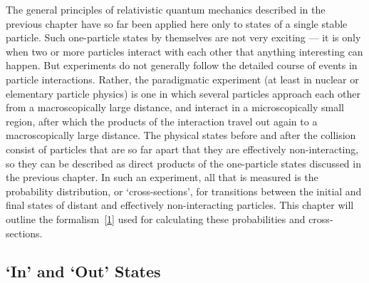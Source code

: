 
The general principles of relativistic quantum mechanics described in the
previous chapter have so far been applied here only to states of a single
stable particle. Such one-particle states by themselves are not very exciting
--- it is only when two or more particles interact with each other that
anything interesting can happen. But experiments do not generally follow the
detailed course of events in particle interactions. Rather, the paradigmatic
experiment (at least in nuclear or elementary particle physics) is one in
which several particles approach each other from a macroscopically large
distance, and interact in a microscopically small region, after which the
products of the interaction travel out again to a macroscopically large
distance. The physical states before and after the collision consist of
particles that are so far apart that they are effectively non-interacting, so
they can be described as direct products of the one-particle states discussed
in the previous chapter. In such an experiment, all that is measured is the
probability distribution, or `cross-sections', for transitions between the
initial and final states of distant and effectively non-interacting particles.
This chapter will outline the formalism~\hyperref[ref:3.1]{[1]} used for calculating these
probabilities and cross-sections.

\subsection{`In' and `Out' States}

